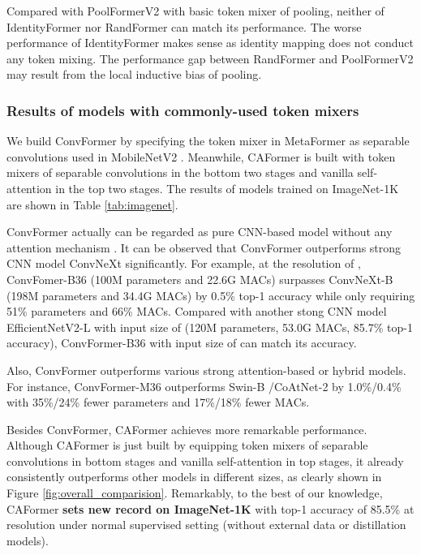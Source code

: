 Compared with PoolFormerV2 \cite{metaformer} with basic token mixer of pooling, neither of IdentityFormer nor RandFormer can match its performance. The worse performance of IdentityFormer makes sense as identity mapping does not conduct any token mixing. The performance gap between RandFormer and PoolFormerV2 may result from the local inductive bias of pooling. 



\subsubsection{Results of models with commonly-used token mixers}
We build ConvFormer by specifying the token mixer in MetaFormer as separable convolutions \cite{chollet2017xception, mamalet2012simplifying} used in MobileNetV2 \cite{mobilenetv2}. Meanwhile, CAFormer is built with token mixers of separable convolutions in the bottom two stages and vanilla self-attention in the top two stages. The results of models trained on ImageNet-1K are shown in Table \ref{tab:imagenet}. 

ConvFormer actually can be regarded as pure CNN-based model without any attention mechanism \cite{senet, woo2018cbam, transformer, vit}. It can be observed that ConvFormer outperforms strong CNN model ConvNeXt \cite{convnext} significantly. For example, at the resolution of , ConvFomer-B36 (100M parameters and 22.6G MACs) surpasses ConvNeXt-B (198M parameters and 34.4G MACs) by 0.5\% top-1 accuracy while only requiring 51\% parameters and 66\% MACs. 
Compared with another stong CNN model EfficientNetV2-L \cite{tan2021efficientnetv2} with input size of  (120M parameters, 53.0G MACs, 85.7\% top-1 accuracy), ConvFormer-B36 with input size of  can match its accuracy.

Also, ConvFormer outperforms various strong attention-based or hybrid models. For instance, ConvFormer-M36 outperforms Swin-B \cite{swin}/CoAtNet-2 \cite{dai2021coatnet} by 1.0\%/0.4\% with 35\%/24\% fewer parameters and 17\%/18\% fewer MACs. 

Besides ConvFormer, CAFormer achieves more remarkable performance. Although CAFormer is just built by equipping token mixers of separable convolutions \cite{chollet2017xception, mamalet2012simplifying, mobilenetv2} in bottom stages and vanilla self-attention \cite{transformer} in top stages, it already consistently outperforms other models in different sizes, as clearly shown in Figure \ref{fig:overall_comparision}. Remarkably, to the best of our knowledge, CAFormer \textbf{sets new record on ImageNet-1K} with top-1 accuracy of 85.5\% at  resolution under normal supervised setting (without external data or distillation models).


